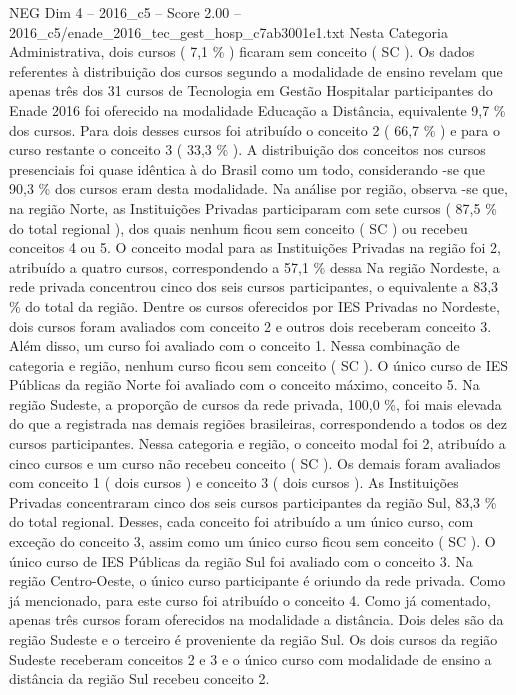 \begin{textsample}{NEG Dim 4 – 2016\_c5 – Score 2.00 – 2016\_c5/enade\_2016\_tec\_gest\_hosp\_c7ab3001e1.txt}
Nesta Categoria Administrativa, dois cursos ( 7,1 \% ) ficaram sem conceito ( SC ).
Os dados referentes à distribuição dos cursos segundo a modalidade de ensino revelam que apenas três dos 31 cursos de Tecnologia em Gestão Hospitalar participantes do Enade 2016 foi oferecido na modalidade Educação a Distância, equivalente 9,7 \% dos cursos.
Para dois desses cursos foi atribuído o conceito 2 ( 66,7 \% ) e para o curso restante o conceito 3 ( 33,3 \% ).
A distribuição dos conceitos nos cursos presenciais foi quase idêntica à do Brasil como um todo, considerando -se que 90,3 \% dos cursos eram desta modalidade.
Na análise por região, observa -se que, na região Norte, as Instituições Privadas participaram com sete cursos ( 87,5 \% do total regional ), dos quais nenhum ficou sem conceito ( SC ) ou recebeu conceitos 4 ou 5.
O conceito modal para as Instituições Privadas na região foi 2, atribuído a quatro cursos, correspondendo a 57,1 \% dessa Na região Nordeste, a rede privada concentrou cinco dos seis cursos participantes, o equivalente a 83,3 \% do total da região.
Dentre os cursos oferecidos por IES Privadas no Nordeste, dois cursos foram avaliados com conceito 2 e outros dois receberam conceito 3.
Além disso, um curso foi avaliado com o conceito 1.
Nessa combinação de categoria e região, nenhum curso ficou sem conceito ( SC ).
O único curso de IES Públicas da região Norte foi avaliado com o conceito máximo, conceito 5.
Na região Sudeste, a proporção de cursos da rede privada, 100,0 \%, foi mais elevada do que a registrada nas demais regiões brasileiras, correspondendo a todos os dez cursos participantes.
Nessa categoria e região, o conceito modal foi 2, atribuído a cinco cursos e um curso não recebeu conceito ( SC ).
Os demais foram avaliados com conceito 1 ( dois cursos ) e conceito 3 ( dois cursos ).
As Instituições Privadas concentraram cinco dos seis cursos participantes da região Sul, 83,3 \% do total regional.
Desses, cada conceito foi atribuído a um único curso, com exceção do conceito 3, assim como um único curso ficou sem conceito ( SC ).
O único curso de IES Públicas da região Sul foi avaliado com o conceito 3.
Na região Centro-Oeste, o único curso participante é oriundo da rede privada.
Como já mencionado, para este curso foi atribuído o conceito 4.
Como já comentado, apenas três cursos foram oferecidos na modalidade a distância.
Dois deles são da região Sudeste e o terceiro é proveniente da região Sul.
Os dois cursos da região Sudeste receberam conceitos 2 e 3 e o único curso com modalidade de ensino a distância da região Sul recebeu conceito 2.

\end{textsample}

